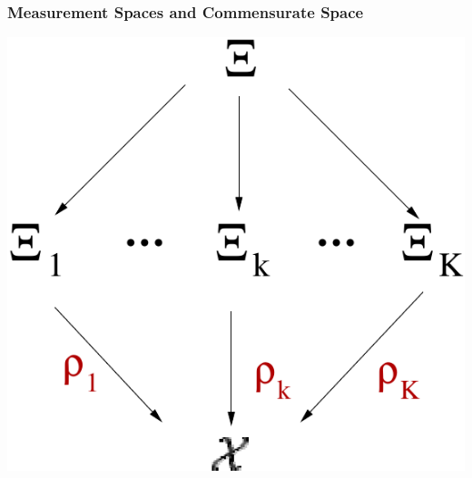 \documentclass{beamer}
\begin{document}
\begin{frame}
\frametitle{Measurement Spaces and Commensurate Space}
\begin{center}
    \includegraphics[scale=0.7]{gen-model-orig-proj.pdf}
  \end{center}

\end{frame}
\end{document}
